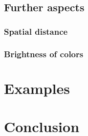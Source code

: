 \subsection{Further aspects}

\subsubsection{Spatial distance}

\subsubsection{Brightness of colors}

\section{Examples}

\section{Conclusion}

